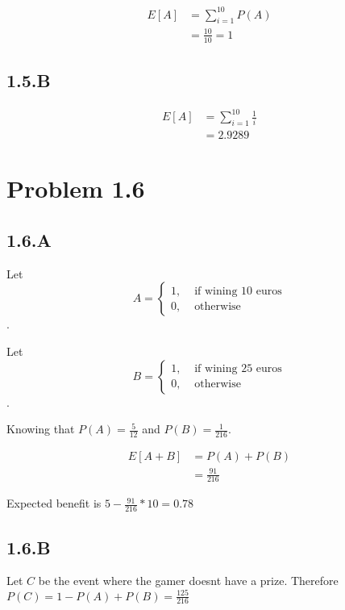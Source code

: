 \documentclass[12pt, a4paper]{article}
\begin{document}
\begin{subequations}
  \begin{align}
    E[A] &= \sum_{i=1}^{10} P(A)\\
         &= \frac{10}{10} = 1
  \end{align}
\end{subequations}

\subsection{1.5.B}
\begin{subequations}
  \begin{align}
    E[A] &= \sum_{i=1}^{10} \frac{1}{i}\\
         &= 2.9289
  \end{align}
\end{subequations}

\section{Problem 1.6}
\subsection{1.6.A}
Let 
\[
  A = \begin{cases}
      1, & \text{ if wining 10 euros}\\
      0, & \text{ otherwise }
      \end{cases}
\].

Let 
\[
  B = \begin{cases}
      1, & \text{ if wining 25 euros}\\
      0, & \text{ otherwise }
      \end{cases}
\].

Knowing that $P(A) = \frac{5}{12}$ and $P(B) = \frac{1}{216}$.

\begin{subequations}
  \begin{align}
    E[A+B] &= P(A) + P(B)\\
           &= \frac{91}{216}
  \end{align}
\end{subequations}

Expected benefit is $5-\frac{91}{216}*10 = 0.78$

\subsection{1.6.B}
Let $C$ be the event where the gamer doesnt have a prize.
Therefore $P(C)=1-P(A)+P(B)=\frac{125}{216}$
\end{document}
